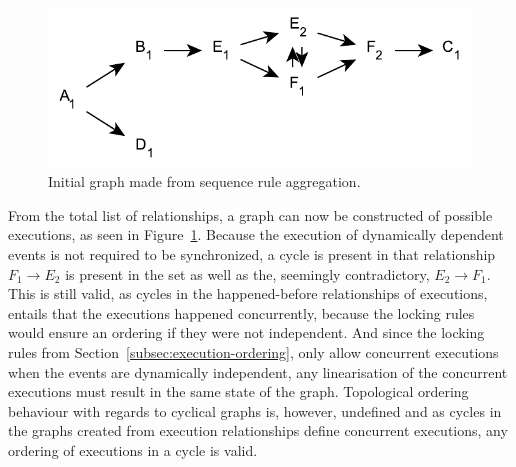 \documentclass{article}
\begin{document}
	\begin{figure}[ht!]
		\center
		\includegraphics[scale=0.6]{figures/dcr-graphs/execution-sequence-graph-example.pdf}
		\caption{Initial graph made from sequence rule aggregation.}
		\label{fig:execution-sequence-graph-example}
	\end{figure}
    \FloatBarrier

	From the total list of relationships, a graph can now be constructed of possible executions, as seen in Figure~\ref{fig:execution-sequence-graph-example}.
	Because the execution of dynamically dependent events is not required to be synchronized, a cycle is present in that relationship $F_1 \rightarrow E_2$ is present in the set as well as the, seemingly contradictory, $E_2 \rightarrow F_1$.
	This is still valid, as cycles in the happened-before relationships of executions, entails that the executions happened concurrently, because the locking rules would ensure an ordering if they were not independent.
	And since the locking rules from Section~\ref{subsec:execution-ordering}, only allow concurrent executions when the events are dynamically independent, any linearisation of the concurrent executions must result in the same state of the graph.
	Topological ordering behaviour with regards to cyclical graphs is, however, undefined and as cycles in the graphs created from execution relationships define concurrent executions, any ordering of executions in a cycle is valid.
\end{document}
